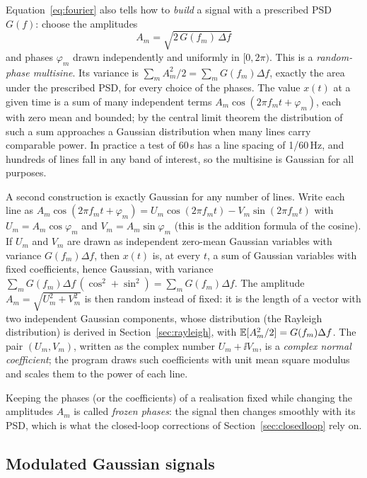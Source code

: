 Equation~\eqref{eq:fourier} also tells how to \emph{build} a signal with a prescribed PSD $G(f)$:
choose the amplitudes
\begin{equation}\label{eq:amplitudes}
  A_m = \sqrt{2\,G(f_m)\,\Delta f}
\end{equation}
and phases $\varphi_m$ drawn independently and uniformly in $[0,2\pi)$. This is a
\emph{random-phase multisine}. Its variance is $\sum_m A_m^2/2 = \sum_m G(f_m)\Delta f$, exactly the
area under the prescribed PSD, for every choice of the phases. The value $x(t)$ at a given time is a
sum of many independent terms $A_m\cos(2\pi f_m t+\varphi_m)$, each with zero mean and bounded; by the
central limit theorem the distribution of such a sum approaches a Gaussian distribution when many
lines carry comparable power. In practice a test of 60\,s has a line spacing of 1/60\,Hz, and
hundreds of lines fall in any band of interest, so the multisine is Gaussian for all purposes.

A second construction is exactly Gaussian for any number of lines. Write each line as
$A_m\cos(2\pi f_m t+\varphi_m) = U_m\cos(2\pi f_m t) - V_m\sin(2\pi f_m t)$ with $U_m =
A_m\cos\varphi_m$ and $V_m = A_m\sin\varphi_m$ (this is the addition formula of the cosine). If $U_m$
and $V_m$ are drawn as independent zero-mean Gaussian variables with variance $G(f_m)\Delta f$, then
$x(t)$ is, at every $t$, a sum of Gaussian variables with fixed coefficients, hence Gaussian, with
variance $\sum_m G(f_m)\Delta f\,(\cos^2+\sin^2) = \sum_m G(f_m)\Delta f$. The amplitude $A_m =
\sqrt{U_m^2+V_m^2}$ is then random instead of fixed: it is the length of a vector with two independent
Gaussian components, whose distribution (the Rayleigh distribution) is derived in
Section~\ref{sec:rayleigh},
with $\mathbb{E}[A_m^2/2] = G(f_m)\Delta f$. The pair $(U_m, V_m)$, written as the complex number $U_m+\ii V_m$,
is a \emph{complex normal coefficient}; the program draws such coefficients with unit mean square
modulus and scales them to the power of each line.

Keeping the phases (or the coefficients) of a realisation fixed while changing the amplitudes
$A_m$ is called \emph{frozen phases}: the signal then changes smoothly with its PSD, which is what
the closed-loop corrections of Section~\ref{sec:closedloop} rely on.

\subsection{Modulated Gaussian signals}\label{sec:modulated}

